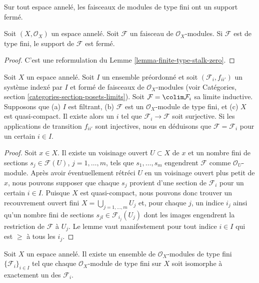 \begin{lemma}
\label{lemma-support-finite-type-closed}
\begin{slogan}
Sur tout espace annelé, les faisceaux de modules de type fini ont un support
fermé.
\end{slogan}
Soit $(X, \mathcal{O}_X)$ un espace annelé. Soit $\mathcal{F}$ un faisceau de
$\mathcal{O}_X$-modules. Si $\mathcal{F}$ est de type fini, le support de
$\mathcal{F}$ est fermé.
\end{lemma}

\begin{proof}
C'est une reformulation du Lemme \ref{lemma-finite-type-stalk-zero}.
\end{proof}

\begin{lemma}
\label{lemma-finite-type-quasi-compact-colimit}
Soit $X$ un espace annelé. Soit $I$ un ensemble préordonné et soit
$(\mathcal{F}_i, f_{ii'})$ un système indexé par $I$ et formé de faisceaux de
$\mathcal{O}_X$-modules (voir Catégories, section
\ref{categories-section-posets-limits}). Soit
$\mathcal{F} = \colim \mathcal{F}_i$ sa limite inductive. Supposons que
(a) $I$ est filtrant, (b) $\mathcal{F}$ est un $\mathcal{O}_X$-module de type
fini, et (c) $X$ est quasi-compact. Il existe alors un $i$ tel que
$\mathcal{F}_i \to \mathcal{F}$ soit surjective. Si les applications de
transition $f_{ii'}$ sont injectives, nous en déduisons que
$\mathcal{F} = \mathcal{F}_i$ pour un certain $i \in I$.
\end{lemma}

\begin{proof}
Soit $x \in X$. Il existe un voisinage ouvert $U \subset X$ de $x$ et un
nombre fini de sections $s_j \in \mathcal{F}(U)$, $j = 1, \ldots, m$, tels
que $s_1, \ldots, s_m$ engendrent $\mathcal{F}$ comme
$\mathcal{O}_U$-module. Après avoir éventuellement rétréci $U$ en un voisinage
ouvert plus petit de $x$, nous pouvons supposer que chaque $s_j$ provient
d'une section de $\mathcal{F}_i$ pour un certain $i \in I$. Puisque $X$ est
quasi-compact, nous pouvons donc trouver un recouvrement ouvert fini
$X = \bigcup_{j = 1, \ldots, m} U_j$ et, pour chaque $j$, un indice $i_j$
ainsi qu'un nombre fini de sections
$s_{jl} \in \mathcal{F}_{i_j}(U_j)$ dont les images engendrent la restriction
de $\mathcal{F}$ à $U_j$. Le lemme vaut manifestement pour tout indice
$i \in I$ qui est $\geq$ à tous les $i_j$.
\end{proof}

\begin{lemma}
\label{lemma-set-isomorphism-classes-finite-type-modules}
Soit $X$ un espace annelé. Il existe un ensemble de
$\mathcal{O}_X$-modules de type fini $\{\mathcal{F}_i\}_{i \in I}$ tel que
chaque $\mathcal{O}_X$-module de type fini sur $X$ soit isomorphe à exactement
un des $\mathcal{F}_i$.
\end{lemma}

